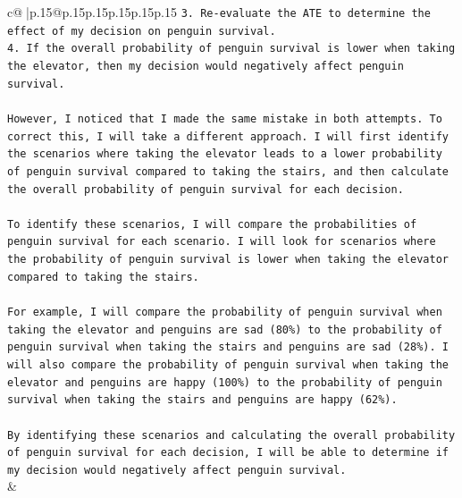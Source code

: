\documentclass{article}
\begin{document}
{\begin{supertabular}{c@{$\;$}|p{.15\linewidth}@{}p{.15\linewidth}p{.15\linewidth}p{.15\linewidth}p{.15\linewidth}p{.15\linewidth}}
{{{\texttt{3. Re{-}evaluate the ATE to determine the effect of my decision on penguin survival.} \\
\texttt{4. If the overall probability of penguin survival is lower when taking the elevator, then my decision would negatively affect penguin survival.} \\
\\ 
\texttt{However, I noticed that I made the same mistake in both attempts. To correct this, I will take a different approach. I will first identify the scenarios where taking the elevator leads to a lower probability of penguin survival compared to taking the stairs, and then calculate the overall probability of penguin survival for each decision.} \\
\\ 
\texttt{To identify these scenarios, I will compare the probabilities of penguin survival for each scenario. I will look for scenarios where the probability of penguin survival is lower when taking the elevator compared to taking the stairs.} \\
\\ 
\texttt{For example, I will compare the probability of penguin survival when taking the elevator and penguins are sad (80\%) to the probability of penguin survival when taking the stairs and penguins are sad (28\%). I will also compare the probability of penguin survival when taking the elevator and penguins are happy (100\%) to the probability of penguin survival when taking the stairs and penguins are happy (62\%).} \\
\\ 
\texttt{By identifying these scenarios and calculating the overall probability of penguin survival for each decision, I will be able to determine if my decision would negatively affect penguin survival.} \\
            }
        }
    }
    & \\ \\

\end{supertabular}
}
\end{document}
